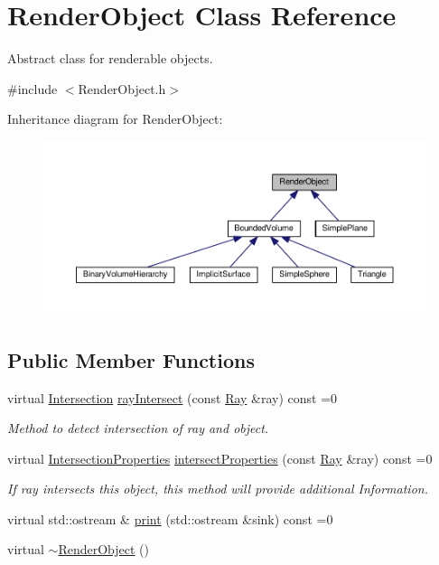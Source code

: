 \hypertarget{classRenderObject}{}\section{Render\+Object Class Reference}
\label{classRenderObject}


Abstract class for renderable objects.  




{\ttfamily \#include $<$Render\+Object.\+h$>$}



Inheritance diagram for Render\+Object\+:\nopagebreak
\begin{figure}[H]
\begin{center}
\leavevmode
\includegraphics[width=350pt]{classRenderObject__inherit__graph}
\end{center}
\end{figure}
\subsection*{Public Member Functions}
\begin{DoxyCompactItemize}
\item 
virtual \hyperlink{classIntersection}{Intersection} \hyperlink{classRenderObject_a681f6674d94f16c4df69605d5e42d05c}{ray\+Intersect} (const \hyperlink{classRay}{Ray} \&ray) const =0
\begin{DoxyCompactList}\small\item\em Method to detect intersection of ray and object. \end{DoxyCompactList}\item 
virtual \hyperlink{classIntersectionProperties}{Intersection\+Properties} \hyperlink{classRenderObject_ae2c6d699741385dcd9ea6a1b09f9b7f0}{intersect\+Properties} (const \hyperlink{classRay}{Ray} \&ray) const =0
\begin{DoxyCompactList}\small\item\em If ray intersects this object, this method will provide additional Information. \end{DoxyCompactList}\item 
virtual std\+::ostream \& \hyperlink{classRenderObject_a7a7f1168a7d96ca95235b170ff7fb11b}{print} (std\+::ostream \&sink) const =0
\item 
virtual \hyperlink{classRenderObject_ac4b49b10f81b6bd12d9a25f4d929d9d8}{$\sim$\+Render\+Object} ()
\end{DoxyCompactItemize}


